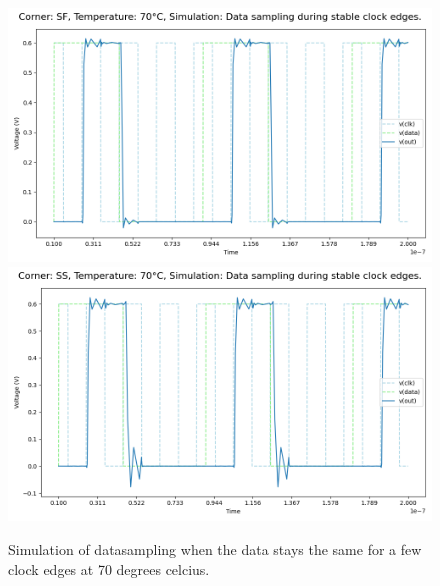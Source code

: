 \begin{figure}[H]
    \vspace{5pt}
    \includegraphics[height= 0.21\textheight]{figures/aimspice/0.600_0.1u_0.1u_0.3u_0.1u/functionality/SF70W2.png}
    \vspace{5pt}
    \includegraphics[height= 0.21\textheight]{figures/aimspice/0.600_0.1u_0.1u_0.3u_0.1u/functionality/SS70W2.png}
    \caption{Simulation of datasampling when the data stays the same for a few clock edges at 70 degrees celcius.}
    \label{fig:aimspice_W2_70}
\end{figure}

\pagebreak

\pagebreak

